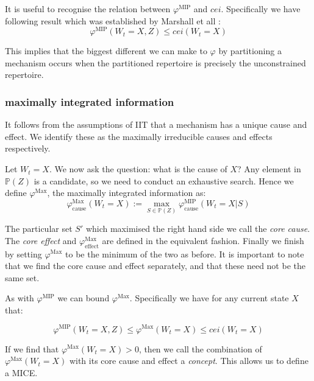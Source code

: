 It is useful to recognise the relation between $\varphi^{\text{MIP}}$ and $cei$. Specifically we have following result which was established by Marshall et all \cite{IITbounds}:
\begin{equation}
\label{eq:bound_phi_cei}
\varphi^{\text{MIP}}(W_t=X, Z) \leq cei(W_t=X) 
\end{equation}

This implies that the biggest different we can make to $\varphi$ by partitioning a mechanism occurs when the partitioned repertoire is precisely the unconstrained repertoire. 

\subsubsection{maximally integrated information}
It follows from the assumptions of IIT that a mechanism has a unique cause and effect. We identify these as the maximally irreducible causes and effects respectively. 

Let $W_t = X$. We now ask the question: what is the cause of $X$? Any element in $\mathbb{P}(Z)$ is a candidate, so we need to conduct an exhaustive search. Hence we define $\varphi^{\text{Max}}$, the maximally integrated information as: 
\begin{equation}
\label{def:core_cause}
\varphi^{\text{Max}}_{\text{cause}}(W_t = X):=\max \limits_{S \in \mathbb{P}(Z)}\varphi^{\text{MIP}}_{\text{cause}}(W_t = X|S)
\end{equation}

The particular set $S'$ which maximised the right hand side we call the \textit{core cause}. The \textit{core effect} and $\varphi^{\text{Max}}_{\text{effect}}$ are defined in the equivalent fashion. Finally we finish  by setting $\varphi^{\text{Max}}$ to be the minimum of the two as before. It is important to note that we find the core cause and effect separately, and that these need not be the same set.

As with $\varphi^{\text{MIP}}$ we can bound $\varphi^{\text{Max}}$. Specifically we have for any current state $X$ that:

\begin{equation}
\label{eq:bound_phimax}
\varphi^{\text{MIP}}(W_t = X, Z) \leq \varphi^{\text{Max}}(W_t = X)\leq cei(W_t = X)
\end{equation}

If we find that $\varphi^{\text{Max}}(W_t = X)>0$, then we call the combination of $\varphi^{\text{Max}}(W_t = X)$ with its core cause and effect a \textit{concept}. This allows us to define a MICE.

